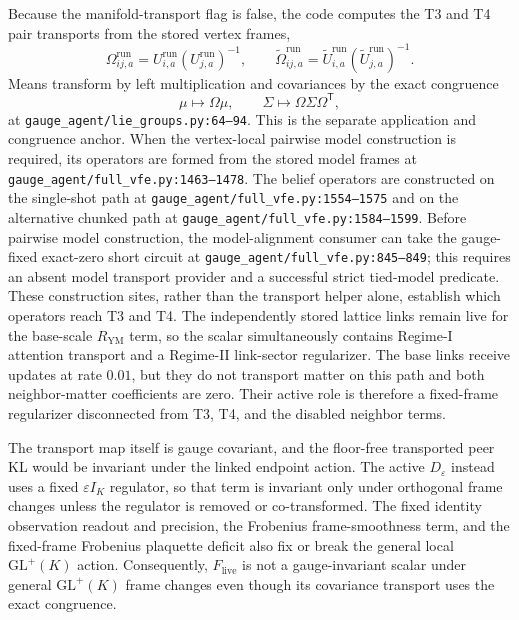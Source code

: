 Because the manifold-transport flag is false, the code computes the T3 and T4 pair transports from the stored vertex frames,
\begin{equation}
 \Omega_{ij,a}^{\mathrm{run}}
 =U_{i,a}^{\mathrm{run}}(U_{j,a}^{\mathrm{run}})^{-1},
 \qquad
 \widetilde\Omega_{ij,a}^{\mathrm{run}}
 =\widetilde U_{i,a}^{\mathrm{run}}
 (\widetilde U_{j,a}^{\mathrm{run}})^{-1}.
\end{equation}
Means transform by left multiplication and covariances by the exact congruence
\begin{equation}
 \mu\mapsto\Omega\mu,
 \qquad
 \Sigma\mapsto\Omega\Sigma\Omega^{\mathsf T},
\end{equation}
at \texttt{gauge\_agent/lie\_groups.py:64--94}. This is the separate application and congruence anchor. When the vertex-local pairwise model construction is required, its operators are formed from the stored model frames at \texttt{gauge\_agent/full\_vfe.py:1463--1478}. The belief operators are constructed on the single-shot path at \texttt{gauge\_agent/full\_vfe.py:1554--1575} and on the alternative chunked path at \texttt{gauge\_agent/full\_vfe.py:1584--1599}. Before pairwise model construction, the model-alignment consumer can take the gauge-fixed exact-zero short circuit at \texttt{gauge\_agent/full\_vfe.py:845--849}; this requires an absent model transport provider and a successful strict tied-model predicate. These construction sites, rather than the transport helper alone, establish which operators reach T3 and T4. The independently stored lattice links remain live for the base-scale $R_{\mathrm{YM}}$ term, so the scalar simultaneously contains Regime-I attention transport and a Regime-II link-sector regularizer. The base links receive updates at rate $0.01$, but they do not transport matter on this path and both neighbor-matter coefficients are zero. Their active role is therefore a fixed-frame regularizer disconnected from T3, T4, and the disabled neighbor terms.

The transport map itself is gauge covariant, and the floor-free transported peer KL would be invariant under the linked endpoint action. The active $D_\varepsilon$ instead uses a fixed $\varepsilon I_K$ regulator, so that term is invariant only under orthogonal frame changes unless the regulator is removed or co-transformed. The fixed identity observation readout and precision, the Frobenius frame-smoothness term, and the fixed-frame Frobenius plaquette deficit also fix or break the general local $\mathrm{GL}^{+}(K)$ action. Consequently, $F_{\mathrm{live}}$ is not a gauge-invariant scalar under general $\mathrm{GL}^{+}(K)$ frame changes even though its covariance transport uses the exact congruence.

